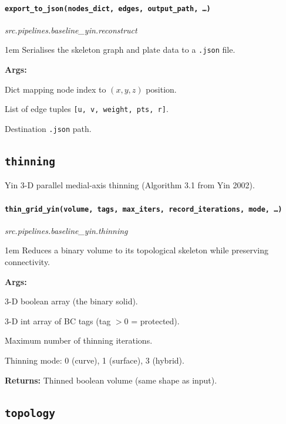 \documentclass[a4paper, 11pt, openany]{report}
\newcommand{\apifunc}[2]{%
    \paragraph{\texttt{#2}}\hfill\textit{\small #1}\par\nopagebreak
}
\begin{document}
\apifunc{src.pipelines.baseline\_yin.reconstruct}{export\_to\_json(nodes\_dict, edges, output\_path, \ldots)}

\begin{adjustwidth}{1em}{}
Serialises the skeleton graph and plate data to a \texttt{.json} file.

\textbf{Args:}
\begin{description}[nosep, labelwidth=3cm, leftmargin=3.5cm]
    \item[\texttt{nodes\_dict}] Dict mapping node index to $(x,y,z)$ position.
    \item[\texttt{edges}] List of edge tuples \texttt{[u, v, weight, pts, r]}.
    \item[\texttt{output\_path}] Destination \texttt{.json} path.
\end{description}
\end{adjustwidth}


\subsection{\texttt{thinning}}

Yin 3-D parallel medial-axis thinning (Algorithm 3.1 from Yin 2002).

\apifunc{src.pipelines.baseline\_yin.thinning}{thin\_grid\_yin(volume, tags, max\_iters, record\_iterations, mode, \ldots)}

\begin{adjustwidth}{1em}{}
Reduces a binary volume to its topological skeleton while preserving
connectivity.

\textbf{Args:}
\begin{description}[nosep, labelwidth=3cm, leftmargin=3.5cm]
    \item[\texttt{volume}] 3-D boolean array (the binary solid).
    \item[\texttt{tags}] 3-D int array of BC tags (tag $> 0$ = protected).
    \item[\texttt{max\_iters}] Maximum number of thinning iterations.
    \item[\texttt{mode}] Thinning mode: 0 (curve), 1 (surface), 3 (hybrid).
\end{description}

\textbf{Returns:} Thinned boolean volume (same shape as input).
\end{adjustwidth}


\subsection{\texttt{topology}}
\end{document}
